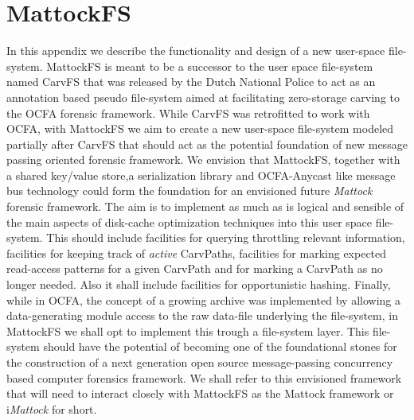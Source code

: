 \chapter{MattockFS}
In this appendix we describe the functionality and design of a new user-space file-system. MattockFS is meant to be a successor to the user space file-system named CarvFS that was released by the Dutch National Police to act as an annotation based pseudo file-system aimed at facilitating zero-storage carving to the OCFA forensic framework. While CarvFS was retrofitted to work with OCFA, with MattockFS we aim to create a new user-space file-system modeled partially after CarvFS that should act as the potential foundation of new message passing oriented forensic framework. We envision that MattockFS, together with a shared key/value store,a serialization library and OCFA-Anycast like message bus technology could form the foundation for an envisioned future \emph{Mattock} forensic framework. The aim is to implement as much as is logical and sensible of the main aspects of disk-cache optimization techniques into this user space file-system. This should include facilities for querying throttling relevant information, facilities for keeping track of \emph{active} CarvPaths, facilities for marking expected read-access patterns for a given CarvPath and for marking a CarvPath as no longer needed. Also it shall include facilities for opportunistic hashing. Finally, while in OCFA, the concept of a growing archive was implemented by allowing a data-generating module access to the raw data-file underlying the file-system, in MattockFS we shall opt to implement this trough a file-system layer. This file-system should have the potential of becoming one of the foundational stones for the construction of a next generation open source message-passing concurrency based computer forensics framework. We shall refer to this envisioned framework that will need to interact closely with MattockFS as the Mattock framework or i\emph{Mattock} for short.
